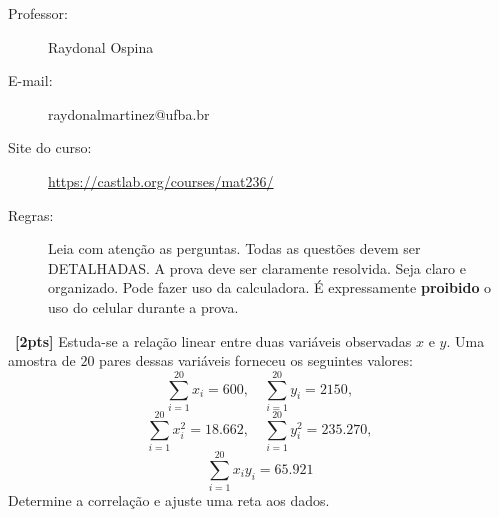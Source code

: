 \documentclass[a4paper,11pt,oneside,twocolumn]{Config/milktest}
\begin{document}
\beb
{
\begin{description}
\item[Professor:] Raydonal Ospina
\item[E-mail:] raydonalmartinez@ufba.br
\item[Site do curso:] \url{https://castlab.org/courses/mat236/}

\item[Regras:] Leia com atenção as perguntas. Todas as questões devem ser DETALHADAS. A prova deve ser claramente resolvida. Seja claro e organizado. Pode fazer uso da calculadora. É expressamente {\bf proibido} o uso do celular durante a prova.

\end{description}
}
\eeb

\balance

\medskip 
\question~\textbf{[2pts]}  Estuda-se a relação linear entre duas variáveis observadas $x$ e $y$. Uma amostra de $20$ pares dessas variáveis forneceu os seguintes valores:
$$
\sum_{i=1}^{20} x_{i}= 600,\quad \sum_{i=1}^{20} y_{i}= 2150, 
$$ 
$$
\sum_{i=1}^{20} x^{2}_{i}= 18.662,\quad \sum_{i=1}^{20} y^{2}_{i}= 235.270,
$$ 
$$
\sum_{i=1}^{20} x_{i}y_{i}= 65.921
$$
Determine a correlação e ajuste uma reta aos dados.


\end{document}
